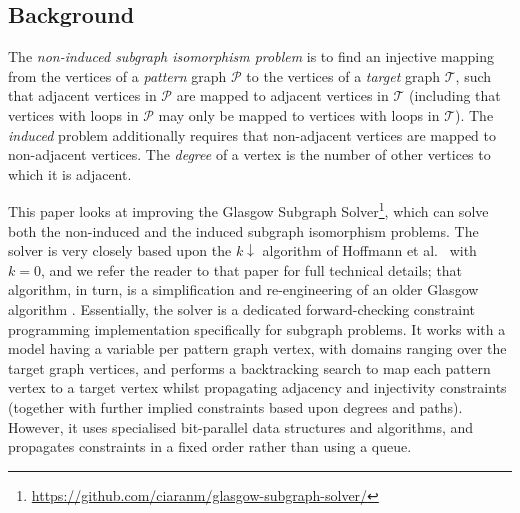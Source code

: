 \documentclass[runningheads]{llncs}
\newcommand{\neighbourhood}{\operatorname{N}}
\newcommand{\vertexset}{\operatorname{V}}
\newcommand{\citet}[2]{#1\cite{#2}}
\begin{document}
\subsection{Background}


The \emph{non-induced subgraph isomorphism problem} is to find an injective mapping from the
vertices of a \emph{pattern} graph $\mathcal{P}$ to the vertices of a \emph{target} graph
$\mathcal{T}$, such that adjacent vertices in $\mathcal{P}$ are mapped to adjacent vertices in
$\mathcal{T}$ (including that vertices with loops in $\mathcal{P}$ may only be mapped to vertices
with loops in $\mathcal{T}$).  The \emph{induced} problem additionally requires that non-adjacent
vertices are mapped to non-adjacent vertices. The \emph{degree} of a vertex is the number of other
vertices to which it is adjacent.


This paper looks at improving the Glasgow Subgraph
Solver\footnote{\url{https://github.com/ciaranm/glasgow-subgraph-solver/}}, which can solve both the
non-induced and the induced subgraph isomorphism problems.  The solver is very closely based upon
the $k{\downarrow}$ algorithm of \citet{Hoffmann et al.\ }{DBLP:conf/aaai/HoffmannMR17} with $k =
0$, and we refer the reader to that paper for full technical details; that algorithm, in turn, is a
simplification and re-engineering of an older Glasgow algorithm
\cite{DBLP:conf/cp/McCreeshP15,DBLP:conf/lion/KotthoffMS16}.  Essentially, the solver is
a dedicated forward-checking constraint programming implementation specifically for subgraph
problems. It works with a model having a variable per pattern graph vertex, with domains ranging
over the target graph vertices, and performs a backtracking search to map each pattern vertex to a
target vertex whilst propagating adjacency and injectivity constraints (together with further
implied constraints based upon degrees and paths).  However, it uses specialised bit-parallel data
structures and algorithms, and propagates constraints in a fixed order rather than using a queue.
\end{document}
